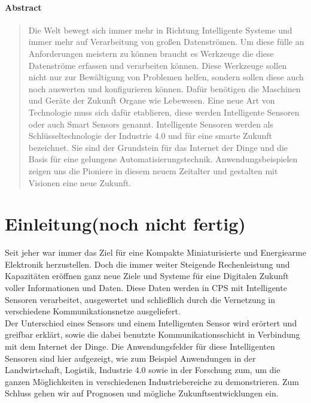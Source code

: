\documentclass[a4paper,12pt]{scrartcl}
\begin{document}
\paragraph{\large Abstract}
\begin{abstract}
Die Welt bewegt sich immer mehr in Richtung Intelligente Systeme und immer mehr auf Verarbeitung von großen Datenströmen. Um diese fülle an Anforderungen meistern zu können braucht es Werkzeuge die diese Datenströme erfassen und verarbeiten können. Diese Werkzeuge sollen nicht nur zur Bewältigung von Problemen helfen, sondern sollen diese auch noch auswerten und konfigurieren können. Dafür benötigen die Maschinen und Geräte der Zukunft Organe wie Lebewesen. Eine neue Art von Technologie muss sich dafür etablieren, diese werden Intelligente Sensoren oder auch Smart Sensors genannt.
Intelligente Sensoren werden als Schlüsseltechnologie der Industrie 4.0 und für eine smarte Zukunft bezeichnet. Sie sind der Grundstein für das Internet der Dinge und die Basis für eine gelungene Automatisierungstechnik. Anwendungsbeispielen zeigen uns die Pioniere in diesem neuem Zeitalter und gestalten mit Visionen eine neue Zukunft.
\end{abstract}


\section{Einleitung(noch nicht fertig)}
Seit jeher war immer das Ziel für eine Kompakte Miniaturisierte und Energiearme Elektronik herzustellen. Doch die immer weiter Steigende Rechenleistung und Kapazitäten eröffnen ganz neue Ziele und Systeme für eine Digitalen Zukunft voller Informationen und Daten. Diese Daten werden in CPS mit Intelligente Sensoren verarbeitet, ausgewertet und schließlich durch die Vernetzung in verschiedene Kommunikationsnetze ausgeliefert.\\
Der Unterschied eines Sensors und einem Intelligenten Sensor wird erörtert und greifbar erklärt, sowie die dabei benutzte Kommunikationsschicht in Verbindung mit dem Internet der Dinge.
Die Anwendungsfelder für diese Intelligenten Sensoren sind hier aufgezeigt, wie zum Beispiel Anwendungen in der Landwirtschaft, Logistik, Industrie 4.0 sowie in der Forschung zum, um die ganzen Möglichkeiten in verschiedenen Industriebereiche zu demonstrieren. Zum Schluss gehen wir auf Prognosen und mögliche Zukunftsentwicklungen ein.

\end{document}
